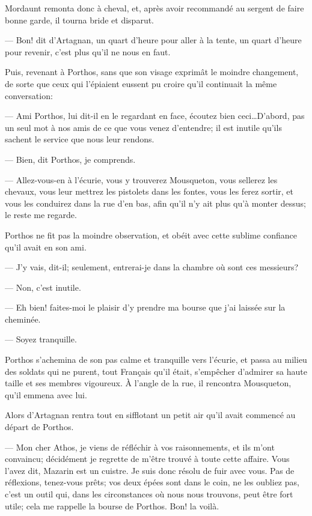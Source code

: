 Mordaunt remonta donc à cheval, et, après avoir recommandé au sergent de faire bonne garde, il tourna bride et disparut.

— Bon! dit d'Artagnan, un quart d'heure pour aller à la tente, un quart d'heure pour revenir, c'est plus qu'il ne nous en faut.

Puis, revenant à Porthos, sans que son visage exprimât le moindre changement, de sorte que ceux qui l'épiaient eussent pu croire qu'il continuait la même conversation:

— Ami Porthos, lui dit-il en le regardant en face, écoutez bien ceci\dots D'abord, pas un seul mot à nos amis de ce que vous venez d'entendre; il est inutile qu'ils sachent le service que nous leur rendons.

— Bien, dit Porthos, je comprends.

— Allez-vous-en à l'écurie, vous y trouverez Mousqueton, vous sellerez les chevaux, vous leur mettrez les pistolets dans les fontes, vous les ferez sortir, et vous les conduirez dans la rue d'en bas, afin qu'il n'y ait plus qu'à monter dessus; le reste me regarde.

Porthos ne fit pas la moindre observation, et obéit avec cette sublime confiance qu'il avait en son ami.

— J'y vais, dit-il; seulement, entrerai-je dans la chambre où sont ces messieurs?

— Non, c'est inutile.

— Eh bien! faites-moi le plaisir d'y prendre ma bourse que j'ai laissée sur la cheminée.

— Soyez tranquille.

Porthos s'achemina de son pas calme et tranquille vers l'écurie, et passa au milieu des soldats qui ne purent, tout Français qu'il était, s'empêcher d'admirer sa haute taille et ses membres vigoureux. À l'angle de la rue, il rencontra Mousqueton, qu'il emmena avec lui.

Alors d'Artagnan rentra tout en sifflotant un petit air qu'il avait commencé au départ de Porthos.

— Mon cher Athos, je viens de réfléchir à vos raisonnements, et ils m'ont convaincu; décidément je regrette de m'être trouvé à toute cette affaire. Vous l'avez dit, Mazarin est un cuistre. Je suis donc résolu de fuir avec vous. Pas de réflexions, tenez-vous prêts; vos deux épées sont dans le coin, ne les oubliez pas, c'est un outil qui, dans les circonstances où nous nous trouvons, peut être fort utile; cela me rappelle la bourse de Porthos. Bon! la voilà.

